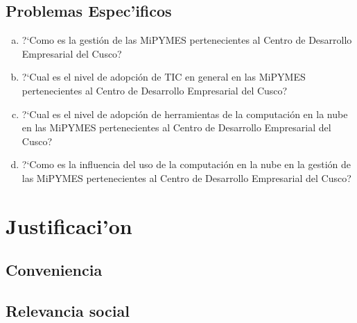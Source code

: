 \subsection{Problemas Espec'ificos}
\begin{enumerate}[a.]
\item ?`Como es la gesti\'on de las MiPYMES pertenecientes al Centro de
Desarrollo Empresarial del Cusco?
\item ?`Cual es el nivel de adopci\'on de TIC en general en las MiPYMES
pertenecientes al Centro de Desarrollo Empresarial del Cusco?
\item ?`Cual es el nivel de adopci\'on de herramientas de la computaci\'on en la
nube en las MiPYMES pertenecientes al Centro de Desarrollo Empresarial del Cusco?
\item ?`Como es la influencia del uso de la computaci\'on en la nube en la
gesti\'on de las MiPYMES pertenecientes al Centro de Desarrollo Empresarial
del Cusco?
\end{enumerate}
%
%
\section{Justificaci'on}
\subsection{Conveniencia}

\subsection{Relevancia social}

